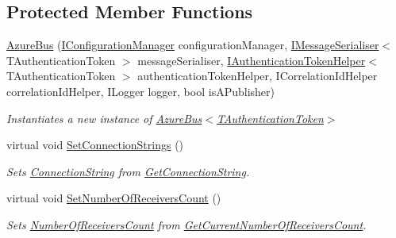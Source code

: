 \subsection*{Protected Member Functions}
\begin{DoxyCompactItemize}
\item 
\hyperlink{classCqrs_1_1Azure_1_1ServiceBus_1_1AzureBus_a1046ff74282fd178f43e28420433d2a9_a1046ff74282fd178f43e28420433d2a9}{Azure\+Bus} (\hyperlink{interfaceCqrs_1_1Configuration_1_1IConfigurationManager}{I\+Configuration\+Manager} configuration\+Manager, \hyperlink{interfaceCqrs_1_1Azure_1_1ServiceBus_1_1IMessageSerialiser}{I\+Message\+Serialiser}$<$ T\+Authentication\+Token $>$ message\+Serialiser, \hyperlink{interfaceCqrs_1_1Authentication_1_1IAuthenticationTokenHelper}{I\+Authentication\+Token\+Helper}$<$ T\+Authentication\+Token $>$ authentication\+Token\+Helper, I\+Correlation\+Id\+Helper correlation\+Id\+Helper, I\+Logger logger, bool is\+A\+Publisher)
\begin{DoxyCompactList}\small\item\em Instantiates a new instance of \hyperlink{classCqrs_1_1Azure_1_1ServiceBus_1_1AzureBus_a1046ff74282fd178f43e28420433d2a9_a1046ff74282fd178f43e28420433d2a9}{Azure\+Bus$<$\+T\+Authentication\+Token$>$} \end{DoxyCompactList}\item 
virtual void \hyperlink{classCqrs_1_1Azure_1_1ServiceBus_1_1AzureBus_a8a1be9145b0a92c0037ef1b8b4cc79d9_a8a1be9145b0a92c0037ef1b8b4cc79d9}{Set\+Connection\+Strings} ()
\begin{DoxyCompactList}\small\item\em Sets \hyperlink{classCqrs_1_1Azure_1_1ServiceBus_1_1AzureBus_aaccdbc8cd25d3ae4f1a2801d2ad02a96_aaccdbc8cd25d3ae4f1a2801d2ad02a96}{Connection\+String} from \hyperlink{classCqrs_1_1Azure_1_1ServiceBus_1_1AzureBus_a514e371d5ce093678365af31e6c274e3_a514e371d5ce093678365af31e6c274e3}{Get\+Connection\+String}. \end{DoxyCompactList}\item 
virtual void \hyperlink{classCqrs_1_1Azure_1_1ServiceBus_1_1AzureBus_a7633f211059ee45dfb907b16a955a790_a7633f211059ee45dfb907b16a955a790}{Set\+Number\+Of\+Receivers\+Count} ()
\begin{DoxyCompactList}\small\item\em Sets \hyperlink{classCqrs_1_1Azure_1_1ServiceBus_1_1AzureBus_a65ca2b61bf8f2dba9d0e0f54ec64c2b9_a65ca2b61bf8f2dba9d0e0f54ec64c2b9}{Number\+Of\+Receivers\+Count} from \hyperlink{classCqrs_1_1Azure_1_1ServiceBus_1_1AzureBus_a8489f49aa20b972411e12465baa1bd14_a8489f49aa20b972411e12465baa1bd14}{Get\+Current\+Number\+Of\+Receivers\+Count}. \end{DoxyCompactList}\item 

\end{DoxyCompactItemize}
